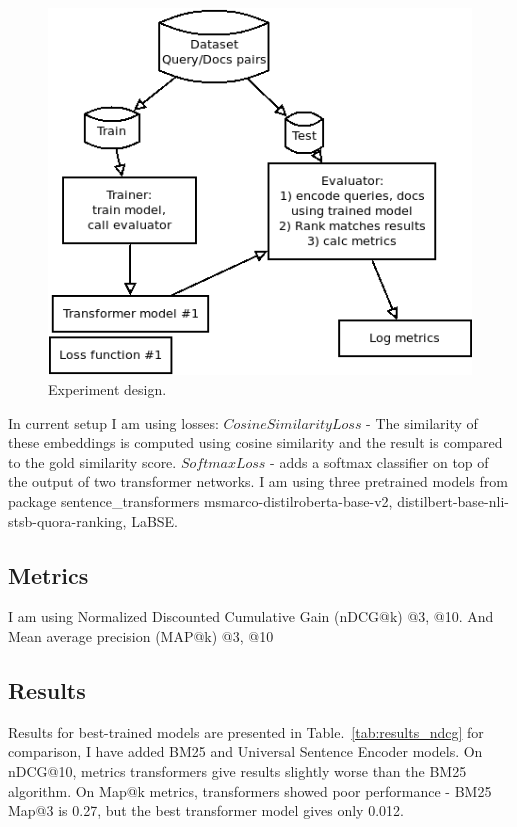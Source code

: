 \documentclass{article}
\begin{document}
\begin{figure}[!tbh]
    \centering
    \includegraphics[width=1\linewidth]{Experiment_diagram.png}
    \caption{Experiment design.}
    \label{fig:experiment}
\end{figure}

In current setup I am using losses: $CosineSimilarityLoss$ - The similarity of these embeddings is computed using cosine similarity and the result is compared to the gold similarity score.
$SoftmaxLoss$ - adds a softmax classifier on top of the output of two transformer networks.
I am using three pretrained models from package sentence\_transformers msmarco-distilroberta-base-v2,  distilbert-base-nli-stsb-quora-ranking, LaBSE.

\subsection{Metrics} 
I am using Normalized Discounted Cumulative Gain (nDCG@k) @3, @10. And Mean average precision (MAP@k) @3, @10


\subsection{Results}

Results for best-trained models are presented in Table.~\ref{tab:results_ndcg} for comparison, I have added BM25 and Universal Sentence Encoder models.
On nDCG@10, metrics transformers give results slightly worse than the BM25 algorithm. On Map@k metrics, transformers showed poor performance - BM25 Map@3 is 0.27, but the best transformer model gives only 0.012.
\end{document}
